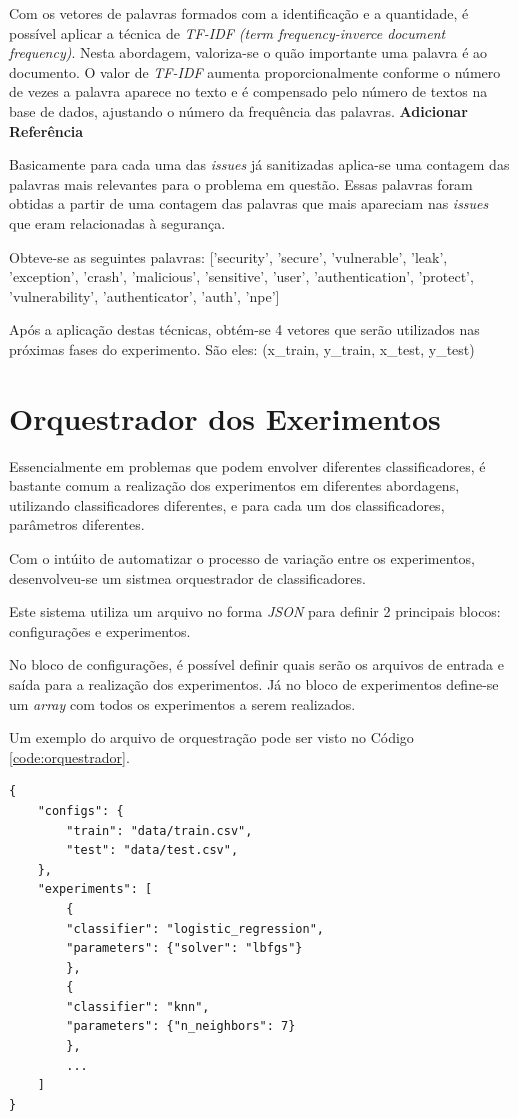\documentclass[conference]{IEEEtran}
\begin{document}
Com os vetores de palavras formados com a identificação e a quantidade, é possível aplicar a técnica de \textit{TF-IDF (term frequency-inverce document frequency)}.  Nesta abordagem, valoriza-se o quão importante uma palavra é ao documento. O valor de \textit{TF-IDF} aumenta proporcionalmente conforme o número de vezes a palavra aparece no texto e é compensado pelo número de textos na base de dados, ajustando o número da frequência das palavras. \textbf{Adicionar Referência}

Basicamente para cada uma das \textit{issues} já sanitizadas aplica-se uma contagem das palavras mais relevantes para o problema em questão. Essas palavras foram obtidas a partir de uma contagem das palavras que mais apareciam nas \textit{issues} que eram relacionadas à segurança.

Obteve-se as seguintes palavras: ['security', 'secure', 'vulnerable', 'leak', 'exception', 'crash', 'malicious',
'sensitive', 'user', 'authentication', 'protect', 'vulnerability', 'authenticator', 'auth', 'npe']

Após a aplicação destas técnicas, obtém-se 4 vetores que serão utilizados nas próximas fases do experimento. São eles: (x\_train, y\_train, x\_test, y\_test)

\section{Orquestrador dos Exerimentos}

Essencialmente em problemas que podem envolver diferentes classificadores, é bastante comum a realização dos experimentos em diferentes abordagens, utilizando classificadores diferentes, e para cada um dos classificadores, parâmetros diferentes.

Com o intúito de automatizar o processo de variação entre os experimentos, desenvolveu-se um sistmea orquestrador de classificadores.

Este sistema utiliza um arquivo no forma \textit{JSON} para definir 2 principais blocos: configurações e experimentos.

No bloco de configurações, é possível definir quais serão os arquivos de entrada e saída para a realização dos experimentos. Já no bloco de experimentos define-se um \textit{array} com todos os experimentos a serem realizados.

Um exemplo do arquivo de orquestração pode ser visto no Código \ref{code:orquestrador}.

\begin{lstlisting}[caption={JSON do Orquestrador},captionpos=b,frame=single,label={code:orquestrador}]
{
    "configs": {
        "train": "data/train.csv",
        "test": "data/test.csv",
    },
    "experiments": [
        {
        "classifier": "logistic_regression",
        "parameters": {"solver": "lbfgs"}
        },
        {
        "classifier": "knn",
        "parameters": {"n_neighbors": 7}
        },
        ...
    ]
}
\end{lstlisting}
\end{document}
